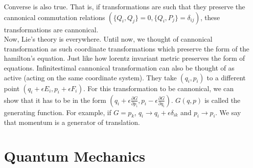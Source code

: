 \documentclass{report}
\begin{document}
\noindent Converse is also true. That is, if transformations are such that they preserve the cannonical commutation relations $(\{Q_i,Q_j\}=0, \{Q_i,P_j\}=\delta_{ij})$, these transformations are cannonical.\\

\noindent Now, Lie's theory is everywhere. Until now, we thought of cannonical transformation as such coordinate transformations which preserve the form of the hamilton's equation. Just like how lorentz invariant metric preserves the form of equations. Infinitestimal cannonical transformation can also be thought of as active (acting on the same coordinate system). They take $(q_i,p_i)$ to a different point $(q_i+\epsilon E_i, p_i+\epsilon F_i)$. For this transformation to be cannonical, we can show that it has to be in the form $(q_i+\epsilon\frac{\partial G}{\partial p_i}, p_i-\epsilon\frac{\partial G}{\partial q_i})$. $G(q,p)$ is called the generating function. For example, if $G = p_k$, $q_i \rightarrow q_i+\epsilon\delta_{ik}$ and $p_i\rightarrow p_i$. We say that momentum is a generator of translation.


\chapter{Quantum Mechanics}
\end{document}
